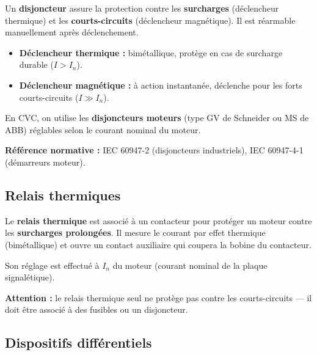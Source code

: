 \begin{definition}
  Un \textbf{disjoncteur} assure la protection contre les \textbf{surcharges} (déclencheur thermique) et les \textbf{courts-circuits} (déclencheur magnétique). Il est réarmable manuellement après déclenchement.

  \begin{itemize}
    \item \textbf{Déclencheur thermique :} bimétallique, protège en cas de surcharge durable ($I > I_n$).
    \item \textbf{Déclencheur magnétique :} à action instantanée, déclenche pour les forts courts-circuits ($I \gg I_n$).
  \end{itemize}

  En CVC, on utilise les \textbf{disjoncteurs moteurs} (type GV de Schneider ou MS de ABB) réglables selon le courant nominal du moteur.

  \textbf{Référence normative :} IEC 60947-2 (disjoncteurs industriels), IEC 60947-4-1 (démarreurs moteur).
\end{definition}

\subsection{Relais thermiques}

\begin{definition}
  Le \textbf{relais thermique} est associé à un contacteur pour protéger un moteur contre les \textbf{surcharges prolongées}. Il mesure le courant par effet thermique (bimétallique) et ouvre un contact auxiliaire qui coupera la bobine du contacteur.

  Son réglage est effectué à $I_n$ du moteur (courant nominal de la plaque signalétique).

  \textbf{Attention :} le relais thermique seul ne protège pas contre les courts-circuits — il doit être associé à des fusibles ou un disjoncteur.
\end{definition}

\subsection{Dispositifs différentiels}

